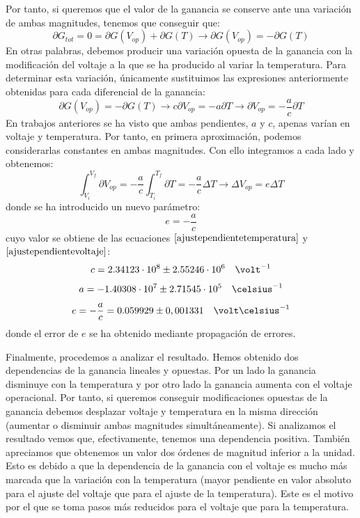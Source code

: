 Por tanto, si queremos que el valor de la ganancia se conserve ante una variación de ambas magnitudes, tenemos que conseguir que: 
\begin{equation}
\partial G_{tot} = 0 =  \partial G(V_{op}) + \partial G(T) \longrightarrow \partial G(V_{op}) = -\partial G(T)  
\label{basecompensacion}
\end{equation}
En otras palabras, debemos producir una  variación opuesta  de la ganancia con la modificación del voltaje a la que se ha producido al variar la temperatura. Para determinar esta variación, únicamente sustituimos las expresiones anteriormente obtenidas para cada diferencial de la ganancia:
\begin{equation}
\partial G(V_{op}) = - \partial G(T)  \longrightarrow c \partial V_{op}= - a \partial T \longrightarrow  \partial V_{op}= - \frac{a}{c} \partial T
\label{compensacionparciales}
\end{equation}
En trabajos anteriores\cite{TFMSiPM2, tesisSiPM, cladtesis} se ha visto que ambas pendientes, $a$ y $c$, apenas varían en voltaje y temperatura. Por tanto, en primera aproximación, podemos considerarlas constantes en ambas magnitudes. Con ello integramos a cada lado y obtenemos:
\begin{equation}
\int_{V_i}^{V_f} \partial V_{op}= - \frac{a}{c} \int_{T_i}^{T_f}\partial T = - \frac{a}{c} \Delta T \longrightarrow \Delta V_{op}= e \Delta T
\label{integral}
\end{equation}
donde se ha introducido un nuevo parámetro: $$e=-\frac{a}{c}$$ cuyo valor se obtiene de las ecuaciones $\eqref{ajustependientetemperatura}$  y $\eqref{ajustependientevoltaje}$:
\begin{equation}
c=2.34123 \cdot 10^8 \pm 2.55246 \cdot 10^6 \quad \volt^{-1}
\label{pendientevoltaje}
\end{equation}
\begin{equation}
a=-1.40308 \cdot 10^7 \pm 2.71545 \cdot 10^5 \quad \celsius^{-1}
\label{pendientetemperatura}
\end{equation}
\begin{equation}
e=-\frac{a}{c} = 0.059929 \pm 0,001331 \quad \volt  \celsius^{-1}
\label{pendientecompensacion}
\end{equation}
donde el error de $e$ se ha obtenido mediante propagación de errores. 

Finalmente, procedemos a analizar el resultado. Hemos obtenido dos dependencias de la ganancia lineales y opuestas. Por un lado la ganancia disminuye con la temperatura y por otro lado la ganancia aumenta con el voltaje operacional. Por tanto, si queremos conseguir modificaciones opuestas de la ganancia debemos desplazar voltaje y temperatura en la misma dirección (aumentar o disminuir ambas magnitudes simultáneamente). Si analizamos el resultado vemos que, efectivamente, tenemos una dependencia positiva.
También apreciamos que obtenemos un valor dos órdenes de magnitud inferior a la unidad. Esto es debido a que la dependencia de la ganancia con el voltaje es mucho más marcada que la variación con la temperatura (mayor pendiente en valor absoluto para el ajuste del voltaje que para el ajuste de la temperatura). Este es el motivo por el que se toma pasos más reducidos para el voltaje que para la temperatura. 

